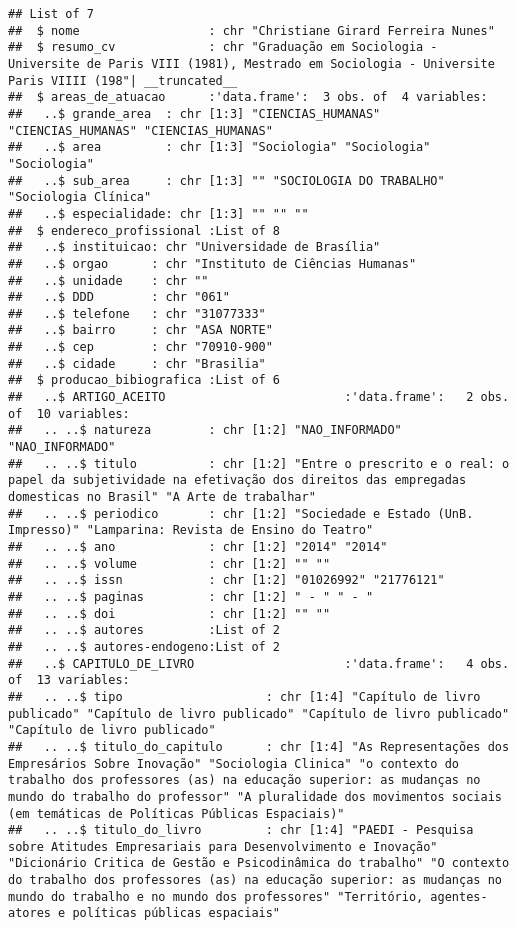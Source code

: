 \documentclass[]{article}
\begin{document}
\begin{verbatim}
## List of 7
##  $ nome                  : chr "Christiane Girard Ferreira Nunes"
##  $ resumo_cv             : chr "Graduação em Sociologia - Universite de Paris VIII (1981), Mestrado em Sociologia - Universite Paris VIIII (198"| __truncated__
##  $ areas_de_atuacao      :'data.frame':  3 obs. of  4 variables:
##   ..$ grande_area  : chr [1:3] "CIENCIAS_HUMANAS" "CIENCIAS_HUMANAS" "CIENCIAS_HUMANAS"
##   ..$ area         : chr [1:3] "Sociologia" "Sociologia" "Sociologia"
##   ..$ sub_area     : chr [1:3] "" "SOCIOLOGIA DO TRABALHO" "Sociologia Clínica"
##   ..$ especialidade: chr [1:3] "" "" ""
##  $ endereco_profissional :List of 8
##   ..$ instituicao: chr "Universidade de Brasília"
##   ..$ orgao      : chr "Instituto de Ciências Humanas"
##   ..$ unidade    : chr ""
##   ..$ DDD        : chr "061"
##   ..$ telefone   : chr "31077333"
##   ..$ bairro     : chr "ASA NORTE"
##   ..$ cep        : chr "70910-900"
##   ..$ cidade     : chr "Brasilia"
##  $ producao_bibiografica :List of 6
##   ..$ ARTIGO_ACEITO                         :'data.frame':   2 obs. of  10 variables:
##   .. ..$ natureza        : chr [1:2] "NAO_INFORMADO" "NAO_INFORMADO"
##   .. ..$ titulo          : chr [1:2] "Entre o prescrito e o real: o papel da subjetividade na efetivação dos direitos das empregadas domesticas no Brasil" "A Arte de trabalhar"
##   .. ..$ periodico       : chr [1:2] "Sociedade e Estado (UnB. Impresso)" "Lamparina: Revista de Ensino do Teatro"
##   .. ..$ ano             : chr [1:2] "2014" "2014"
##   .. ..$ volume          : chr [1:2] "" ""
##   .. ..$ issn            : chr [1:2] "01026992" "21776121"
##   .. ..$ paginas         : chr [1:2] " - " " - "
##   .. ..$ doi             : chr [1:2] "" ""
##   .. ..$ autores         :List of 2
##   .. ..$ autores-endogeno:List of 2
##   ..$ CAPITULO_DE_LIVRO                     :'data.frame':   4 obs. of  13 variables:
##   .. ..$ tipo                    : chr [1:4] "Capítulo de livro publicado" "Capítulo de livro publicado" "Capítulo de livro publicado" "Capítulo de livro publicado"
##   .. ..$ titulo_do_capitulo      : chr [1:4] "As Representações dos Empresários Sobre Inovação" "Sociologia Clinica" "o contexto do trabalho dos professores (as) na educação superior: as mudanças no mundo do trabalho do professor" "A pluralidade dos movimentos sociais (em temáticas de Políticas Públicas Espaciais)"
##   .. ..$ titulo_do_livro         : chr [1:4] "PAEDI - Pesquisa sobre Atitudes Empresariais para Desenvolvimento e Inovação" "Dicionário Critica de Gestão e Psicodinâmica do trabalho" "O contexto do trabalho dos professores (as) na educação superior: as mudanças no mundo do trabalho e no mundo dos professores" "Território, agentes-atores e políticas públicas espaciais"

\end{verbatim}
\end{document}
